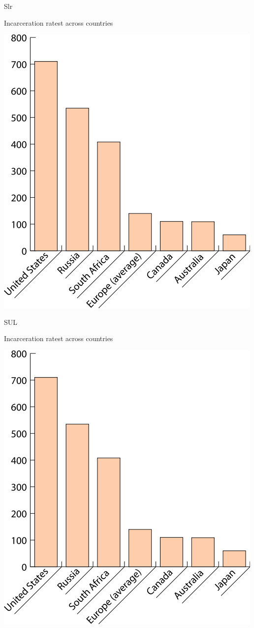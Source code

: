 \begin{chart}{S}{lr}
\caption{Incarceration ratest across countries}
\label{chart:incarceration}
\includegraphics[width=\chartwidth,height=\chartheight]{incarceration}  
\end{chart}

\lipsum[1-4]

\begin{chart}{S}{UL}
\caption{Incarceration ratest across countries}
\label{chart:incarceration}
\includegraphics[width=\chartwidth,height=\chartheight]{incarceration}  
\end{chart}

